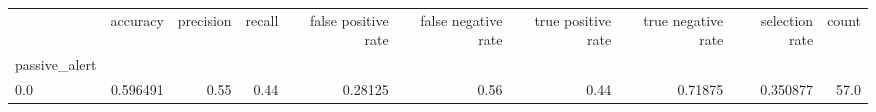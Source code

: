 \begin{tabular}{lrrrrrrrrr}
\toprule
{} &  accuracy &  precision &  recall &  false positive rate &  false negative rate &  true positive rate &  true negative rate &  selection rate &  count \\
passive\_alert &           &            &         &                      &                      &                     &                     &                 &        \\
\midrule
0.0           &  0.596491 &       0.55 &    0.44 &              0.28125 &                 0.56 &                0.44 &             0.71875 &        0.350877 &   57.0 \\
\bottomrule
\end{tabular}
